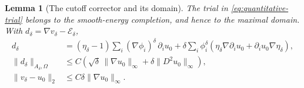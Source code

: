 \documentclass[11pt,a4paper]{article}
\numberwithin{equation}{section}
\newtheorem{lemma}[theorem]{Lemma}
\theoremstyle{definition}
\theoremstyle{remark}\newtheorem{remark}[theorem]{Remark}
\newcommand{\norm}[1]{\lVert #1\rVert}
\begin{document}
\begin{lemma}[The cutoff corrector and its domain]\label{lem:cutoff-domain}
The trial in \eqref{eq:quantitative-trial} belongs to the
smooth-energy completion, and hence to the maximal domain. With
\(d_\delta=\nabla v_\delta-\mathcal E_\delta\),
\begin{align}
 d_\delta
 &= (\eta_\delta-1)\sum_i(\nabla\phi_i)^\delta\,\partial_i u_0
   +\delta\sum_i\phi_i^\delta
       (\eta_\delta\nabla\partial_i u_0+
                          \partial_i u_0\nabla\eta_\delta),
                                      \label{eq:corrector-defect}\\
 \norm{d_\delta}_{A_\delta,\Omega}
 &\leq C\left(\sqrt\delta\,\norm{\nabla u_0}_\infty
                     +\delta\norm{D^2u_0}_\infty\right),
                                      \label{eq:corrector-defect-bound}\\
 \norm{v_\delta-u_0}_2&\leq C\delta\norm{\nabla u_0}_\infty .
                                      \label{eq:corrector-L2}
\end{align}
\end{lemma}
\end{document}
